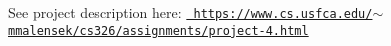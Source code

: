 See project description here\+: \href{https://www.cs.usfca.edu/~mmalensek/cs326/assignments/project-4.html}{\texttt{ https\+://www.\+cs.\+usfca.\+edu/$\sim$mmalensek/cs326/assignments/project-\/4.\+html}} 